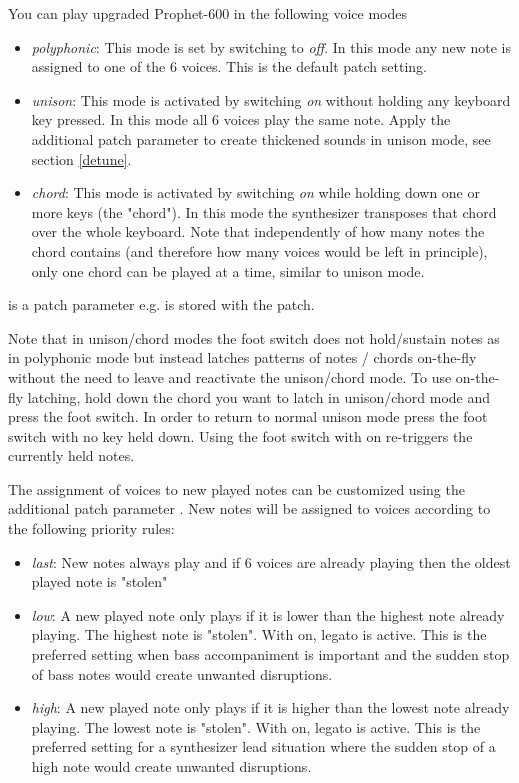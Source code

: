 You can play upgraded Prophet-600 in the following voice modes
\begin{itemize}
  \setlength\itemsep{0cm}
  \item \textit{polyphonic}: This mode is set by switching \unison to \textit{off}. In this mode any new note is assigned to one of the 6 voices. This is the default patch setting.
  \item \textit{unison}: This mode is activated by switching \unison \textit{on} without holding any keyboard key pressed. In this mode all 6 voices play the same note. Apply the additional patch parameter \detune to create thickened sounds in unison mode, see section \ref{detune}.
  \item \textit{chord}: This mode is activated by switching \unison \textit{on} while holding down one or more keys (the "chord"). In this mode the synthesizer transposes that chord over the whole keyboard. Note that independently of how many notes the chord contains (and therefore how many voices would be left in principle), only one chord can be played at a time, similar to unison mode.
\end{itemize} 

\unison is a patch parameter e.g. is stored with the patch.

Note that in unison/chord modes the foot switch does not hold/sustain notes as in polyphonic mode but instead latches patterns of notes / chords on-the-fly without the need to leave and reactivate the unison/chord mode. To use on-the-fly latching, hold down the chord you want to latch in unison/chord mode and press the foot switch. In order to return to normal unison mode press the foot switch with no key held down. Using the foot switch with \unison on re-triggers the currently held notes. 

The assignment of voices to new played notes can be customized using the additional patch parameter \prio. New notes will be assigned to voices according to the following priority rules:

\begin{itemize}
  \setlength\itemsep{0cm}
  \item \textit{last}: New notes always play and if 6 voices are already playing then the oldest played note is "stolen"
  \item \textit{low}: A new played note only plays if it is lower than the highest note already playing. The highest note is "stolen". With \unison on, legato is active. This is the preferred setting when bass accompaniment is important and the sudden stop of bass notes would create unwanted disruptions. 
  \item \textit{high}: A new played note only plays if it is higher than the lowest note already playing. The lowest note is "stolen". With \unison on, legato is active. This is the preferred setting for a synthesizer lead situation where the sudden stop of a high note would create unwanted disruptions. 
\end{itemize}

